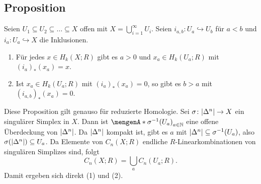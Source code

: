 \subsection[Proposition über Homologie von $X= \bigcup_{a \in N} U_a$ wobei $U_a \subseteq U_{a+1}$]{Proposition} %
\label{sub:1011}
Seien $U_1 \subseteq U_2 \subseteq \ldots  \subseteq X$ offen mit $X = \bigcup_{i=1}^\infty U_i$. Seien $i_{a,b} \colon U_a \hookrightarrow U_b$ für $a < b$ und 
$i_a \colon U_a \hookrightarrow X$ die Inklusionen.
\begin{enumerate}[(1)]
	\item Für jedes $x \in H_k(X;R)$ gibt es $a >0$ und $x_a \in H_k(U_a;R)$ mit $(i_a)_*(x_a)=x$.
	\item Ist $x_a \in H_k(U_a;R)$ mit $(i_a)_*(x_a)=0$, so gibt es $b >a$ mit $(i_{a,b})_*(x_a)=0$.
\end{enumerate}
Diese Proposition gilt genauso für reduzierte Homologie.
Sei $\sigma \colon \abs*{\Delta^n} \to X$ ein singulärer Simplex in $X$. Dann ist $\set{\sigma^{-1}(U_a)}_{a \in \mathds{N}}$ eine offene Überdeckung von $\abs*{\Delta^n}$. 
Da $\abs*{\Delta^n}$ kompakt ist, gibt es $a$ mit $\abs*{\Delta^n} \subseteq \sigma ^{-1}(U_a)$, also $\sigma \enbrace*{\abs*{\Delta^n}} \subseteq U_a$. Da Elemente  von
$C_n(X;R)$ endliche $R$-Linearkombinationen von singulären Simplizes sind, folgt 
\[
	C_n(X;R) = \bigcup_a C_n(U_a;R).
\]
Damit ergeben sich direkt (1) und (2). \bewende

